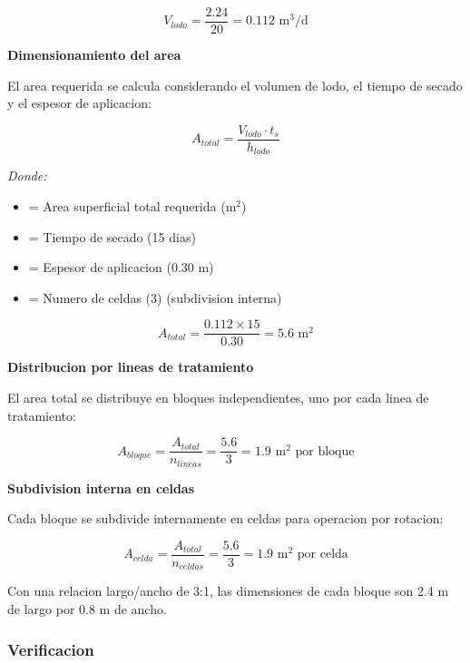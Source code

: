 \documentclass[12pt,a4paper]{article}
\begin{document}
\begin{equation}
V_{lodo} = \frac{2.24}{20} = 0.112 \text{ m}^3\text{/d}
\end{equation}

\textbf{Dimensionamiento del area}

El area requerida se calcula considerando el volumen de lodo, el tiempo de secado y el espesor de aplicacion:

\begin{equation}
A_{total} = \frac{V_{lodo} \cdot t_s}{h_{lodo}}
\end{equation}

\textit{Donde:}
\begin{itemize}[noitemsep,leftmargin=2em]
    \item[$A_{total}$] = Area superficial total requerida (m$^2$)
    \item[$t_s$] = Tiempo de secado (15 dias)
    \item[$h_{lodo}$] = Espesor de aplicacion (0.30 m)
    \item[$n_{celdas}$] = Numero de celdas (3) (subdivision interna)
\end{itemize}

\begin{equation}
A_{total} = \frac{0.112 \times 15}{0.30} = 5.6 \text{ m}^2
\end{equation}

\textbf{Distribucion por lineas de tratamiento}

El area total se distribuye en bloques independientes, uno por cada linea de tratamiento:

\begin{equation}
A_{bloque} = \frac{A_{total}}{n_{lineas}} = \frac{5.6}{3} = 1.9 \text{ m}^2 \text{ por bloque}
\end{equation}

\textbf{Subdivision interna en celdas}

Cada bloque se subdivide internamente en celdas para operacion por rotacion:

\begin{equation}
A_{celda} = \frac{A_{total}}{n_{celdas}} = \frac{5.6}{3} = 1.9 \text{ m}^2 \text{ por celda}
\end{equation}

Con una relacion largo/ancho de 3:1, las dimensiones de cada bloque son 2.4 m de largo por 0.8 m de ancho.

\subsubsection{Verificacion}
\end{document}
